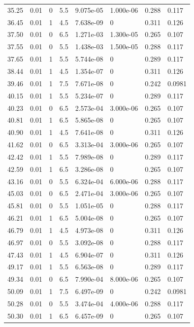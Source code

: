 \documentclass[preview]{standalone}
\begin{document}
{{{\begin{tabular}{L{1.2cm}C{1.2cm} C{0.3cm}C{0.5cm} C{1.4cm}C{1.4cm} C{1.4cm}C{1.4cm}}
  35.25  &  0.01  & 0     & 5.5 &  9.075e-05  & 1.000e-06  & 0.288 &  0.117   \\ 
  36.45  &  0.01  & 1     & 4.5 &  7.638e-09  & 0  & 0.311 &  0.126   \\ 
  37.50  &  0.01  & 0     & 6.5 &  1.271e-03  & 1.300e-05  & 0.265 &  0.107   \\ 
  37.55  &  0.01  & 0     & 5.5 &  1.438e-03  & 1.500e-05  & 0.288 &  0.117   \\ 
  37.65  &  0.01  & 1     & 5.5 &  5.744e-08  & 0  & 0.289 &  0.117   \\ 
  38.44  &  0.01  & 1     & 4.5 &  1.354e-07  & 0  & 0.311 &  0.126   \\ 
  39.46  &  0.01  & 1     & 7.5 &  7.671e-08  & 0  & 0.242 &  0.0981   \\ 
  40.15  &  0.01  & 1     & 5.5 &  5.234e-07  & 0  & 0.289 &  0.117   \\ 
  40.23  &  0.01  & 0     & 6.5 &  2.573e-04  & 3.000e-06  & 0.265 &  0.107   \\ 
  40.81  &  0.01  & 1     & 6.5 &  5.865e-08  & 0  & 0.265 &  0.107   \\ 
  40.90  &  0.01  & 1     & 4.5 &  7.641e-08  & 0  & 0.311 &  0.126   \\ 
  41.62  &  0.01  & 0     & 6.5 &  3.313e-04  & 3.000e-06  & 0.265 &  0.107   \\ 
  42.42  &  0.01  & 1     & 5.5 &  7.989e-08  & 0  & 0.289 &  0.117   \\ 
  42.59  &  0.01  & 1     & 6.5 &  3.286e-08  & 0  & 0.265 &  0.107   \\ 
  43.16  &  0.01  & 0     & 5.5 &  6.324e-04  & 6.000e-06  & 0.288 &  0.117   \\ 
  45.03  &  0.01  & 0     & 6.5 &  2.471e-04  & 3.000e-06  & 0.265 &  0.107   \\ 
  45.81  &  0.01  & 0     & 5.5 &  1.051e-05  & 0  & 0.288 &  0.117   \\ 
  46.21  &  0.01  & 1     & 6.5 &  5.004e-08  & 0  & 0.265 &  0.107   \\ 
  46.79  &  0.01  & 1     & 4.5 &  4.973e-08  & 0  & 0.311 &  0.126   \\ 
  46.97  &  0.01  & 0     & 5.5 &  3.092e-08  & 0  & 0.288 &  0.117   \\ 
  47.43  &  0.01  & 1     & 4.5 &  6.904e-07  & 0  & 0.311 &  0.126   \\ 
  49.17  &  0.01  & 1     & 5.5 &  6.563e-08  & 0  & 0.289 &  0.117   \\ 
  49.34  &  0.01  & 0     & 6.5 &  7.990e-04  & 8.000e-06  & 0.265 &  0.107   \\ 
  50.09  &  0.01  & 1     & 7.5 &  6.497e-09  & 0  & 0.242 &  0.0981   \\ 
  50.28  &  0.01  & 0     & 5.5 &  3.474e-04  & 4.000e-06  & 0.288 &  0.117   \\ 
  50.30  &  0.01  & 1     & 6.5 &  6.457e-09  & 0  & 0.265 &  0.107   \\ 
\hline 
\end{tabular} 

}}}
\end{document}

